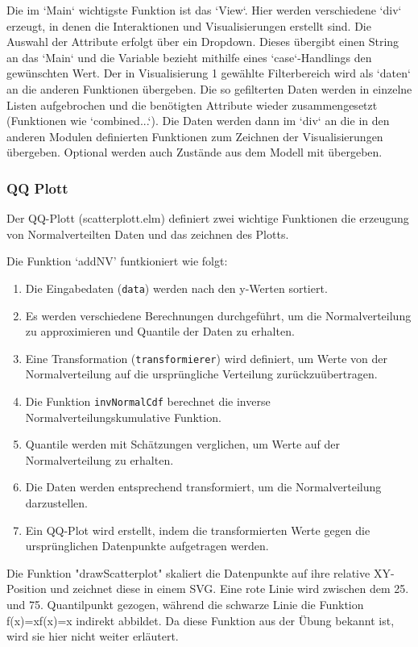\documentclass[usegeometry=true]{scrartcl}
\begin{document}
Die im `Main` wichtigste Funktion ist das `View`. Hier werden verschiedene `div` erzeugt, in denen die Interaktionen und Visualisierungen erstellt sind. Die Auswahl der Attribute erfolgt über ein Dropdown. Dieses übergibt einen String an das `Main` und die Variable bezieht mithilfe eines `case`-Handlings den gewünschten Wert. Der in Visualisierung 1 gewählte Filterbereich wird als `daten` an die anderen Funktionen übergeben. Die so gefilterten Daten werden in einzelne Listen aufgebrochen und die benötigten Attribute wieder zusammengesetzt (Funktionen wie `combined...`). Die Daten werden dann im `div` an die in den anderen Modulen definierten Funktionen zum Zeichnen der Visualisierungen übergeben. Optional werden auch Zustände aus dem Modell mit übergeben.

\subsubsection{QQ Plott}
Der QQ-Plott (scatterplott.elm) definiert zwei wichtige Funktionen die erzeugung von Normalverteilten Daten und das zeichnen des Plotts.

Die Funktion `addNV' funtkioniert wie folgt:
\begin{enumerate}
  \item Die Eingabedaten (\texttt{data}) werden nach den y-Werten sortiert.
  \item Es werden verschiedene Berechnungen durchgeführt, um die Normalverteilung zu approximieren und Quantile der Daten zu erhalten.
  \item Eine Transformation (\texttt{transformierer}) wird definiert, um Werte von der Normalverteilung auf die ursprüngliche Verteilung zurückzuübertragen.
  \item Die Funktion \texttt{invNormalCdf} berechnet die inverse Normalverteilungskumulative Funktion.
  \item Quantile werden mit Schätzungen verglichen, um Werte auf der Normalverteilung zu erhalten.
  \item Die Daten werden entsprechend transformiert, um die Normalverteilung darzustellen.
  \item Ein QQ-Plot wird erstellt, indem die transformierten Werte gegen die ursprünglichen Datenpunkte aufgetragen werden.
\end{enumerate}

Die Funktion "drawScatterplot" skaliert die Datenpunkte auf ihre relative XY-Position und zeichnet diese in einem SVG. Eine rote Linie wird zwischen dem 25. und 75. Quantilpunkt gezogen, während die schwarze Linie die Funktion f(x)=xf(x)=x indirekt abbildet. Da diese Funktion aus der Übung bekannt ist, wird sie hier nicht weiter erläutert.
\end{document}
